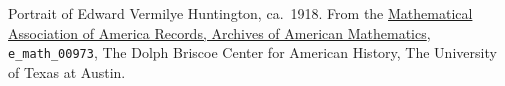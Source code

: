 Portrait of Edward Vermilye Huntington, ca.~1918. From the
\href{http://www.cah.utexas.edu/collections/math.php}{Mathematical
Association of America Records, Archives of American Mathematics},
 \verb|e_math_00973|, The Dolph Briscoe Center for American History, The
University of Texas at Austin.
